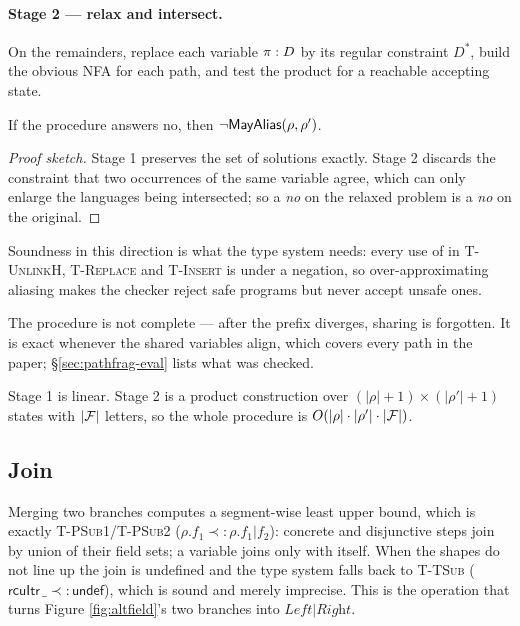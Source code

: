 \paragraph{Stage 2 --- relax and intersect.}
On the remainders, replace each variable $\pi : D$ by its regular constraint
$D^{*}$, build the obvious NFA for each path, and test the product for a
reachable accepting state.

\begin{lemma}[Soundness]
\label{lem:alias-sound}
If the procedure answers \textsf{no}, then $\neg\textsf{MayAlias}(\rho,\rho')$.
\end{lemma}
\begin{proof}[Proof sketch]
Stage 1 preserves the set of solutions exactly.  Stage 2 discards the constraint
that two occurrences of the same variable agree, which can only enlarge the
languages being intersected; so a \emph{no} on the relaxed problem is a \emph{no}
on the original.
\end{proof}

Soundness in this direction is what the type system needs: every use of
\MayAlias{} in \textsc{T-UnlinkH}, \textsc{T-Replace} and \textsc{T-Insert} is
under a negation, so over-approximating aliasing makes the checker reject safe
programs but never accept unsafe ones.

The procedure is not complete --- after the prefix diverges, sharing is
forgotten.  It is exact whenever the shared variables align, which covers every
path in the paper; \S\ref{sec:pathfrag-eval} lists what was checked.

Stage 1 is linear.  Stage 2 is a product construction over
$(|\rho|+1)\times(|\rho'|+1)$ states with $|\mathcal{F}|$ letters, so the whole
procedure is $O(|\rho|\cdot|\rho'|\cdot|\mathcal{F}|)$.

\subsection{Join}
\label{sec:pathfrag-join}

Merging two branches computes a segment-wise least upper bound, which is exactly
\textsc{T-PSub1}/\textsc{T-PSub2} ($\rho.f_1 \prec: \rho.f_1|f_2$): concrete and
disjunctive steps join by union of their field sets; a variable joins only with
itself.  When the shapes do not line up the join is undefined and the type system
falls back to \textsc{T-TSub} ($\textsf{rcuItr}\,\_ \prec: \textsf{undef}$),
which is sound and merely imprecise.  This is the operation that turns Figure
\ref{fig:altfield}'s two branches into $\textit{Left}|\textit{Right}$.


